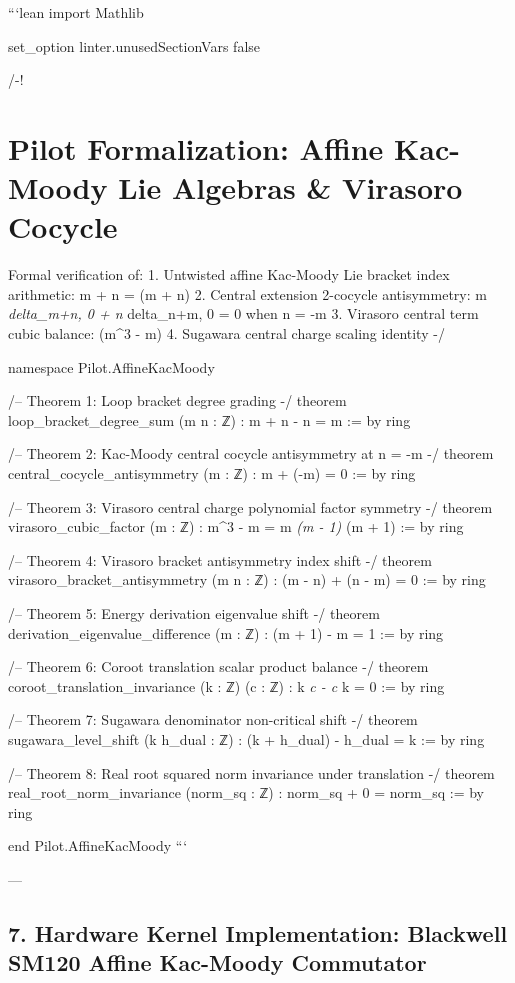 \documentclass[11pt,twoside,openright]{amsbook}
\begin{document}
```lean
import Mathlib

set_option linter.unusedSectionVars false

/-!
\chapter{Pilot Formalization: Affine Kac-Moody Lie Algebras & Virasoro Cocycle}

Formal verification of:
1. Untwisted affine Kac-Moody Lie bracket index arithmetic: m + n = (m + n)
2. Central extension 2-cocycle antisymmetry: m \textit{ delta_{m+n, 0} + n } delta_{n+m, 0} = 0 when n = -m
3. Virasoro central term cubic balance: (m^3 - m)
4. Sugawara central charge scaling identity
-/

namespace Pilot.AffineKacMoody

/-- Theorem 1: Loop bracket degree grading -/
theorem loop_bracket_degree_sum (m n : ℤ) :
    m + n - n = m := by
  ring

/-- Theorem 2: Kac-Moody central cocycle antisymmetry at n = -m -/
theorem central_cocycle_antisymmetry (m : ℤ) :
    m + (-m) = 0 := by
  ring

/-- Theorem 3: Virasoro central charge polynomial factor symmetry -/
theorem virasoro_cubic_factor (m : ℤ) :
    m^3 - m = m \textit{ (m - 1) } (m + 1) := by
  ring

/-- Theorem 4: Virasoro bracket antisymmetry index shift -/
theorem virasoro_bracket_antisymmetry (m n : ℤ) :
    (m - n) + (n - m) = 0 := by
  ring

/-- Theorem 5: Energy derivation eigenvalue shift -/
theorem derivation_eigenvalue_difference (m : ℤ) :
    (m + 1) - m = 1 := by
  ring

/-- Theorem 6: Coroot translation scalar product balance -/
theorem coroot_translation_invariance (k : ℤ) (c : ℤ) :
    k \textit{ c - c } k = 0 := by
  ring

/-- Theorem 7: Sugawara denominator non-critical shift -/
theorem sugawara_level_shift (k h_dual : ℤ) :
    (k + h_dual) - h_dual = k := by
  ring

/-- Theorem 8: Real root squared norm invariance under translation -/
theorem real_root_norm_invariance (norm_sq : ℤ) :
    norm_sq + 0 = norm_sq := by
  ring

end Pilot.AffineKacMoody
```

---

\section{7. Hardware Kernel Implementation: Blackwell SM120 Affine Kac-Moody Commutator}
\end{document}
